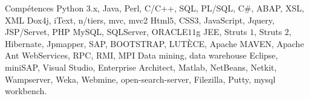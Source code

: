 \begin{rubric}{Compétences}
%
	Python $3$.x, Java, Perl, C/C++, SQL, PL/SQL, C\#, ABAP, XSL, XML 
%
	Dox4j, iText, n/tiers, mvc, mvc2
%
	Html$5$, CSS$3$, JavaScript, Jquery, JSP/Servet, PHP
%
	MySQL, SQLServer, ORACLE$11$g
%
	JEE, Struts $1$, Struts $2$, Hibernate, Jpmapper, SAP, BOOTSTRAP, LUTÈCE, Apache MAVEN, Apache Ant
%
	WebServices, RPC, RMI, MPI
%
	Data mining, data warehouse 
\entry*[Outils]%
	Eclipse, miniSAP, Visual Studio, Enterprise Architect, Matlab, NetBeans, Netkit, Wampserver, Weka, Webmine, open-search-server, Filezilla, Putty, mysql workbench.


\end{rubric}
